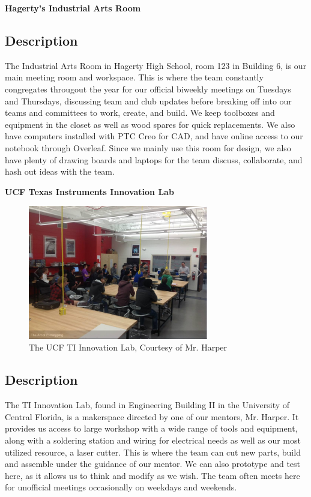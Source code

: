 \textbf {\large Hagerty's Industrial Arts Room}

\subsection*{Description}
The Industrial Arts Room in Hagerty High School, room 123 in Building 6, is our main meeting room and workspace. This is where the team constantly congregates througout the year for our official biweekly meetings on Tuesdays and Thursdays, discussing team and club updates before breaking off into our teams and committees to work, create, and build. We keep toolboxes and equipment in the closet as well as wood spares for quick replacements. We also have computers installed with PTC Creo for CAD, and have online access to our notebook through Overleaf. Since we mainly use this room for design, we also have plenty of drawing boards and laptops for the team discuss, collaborate, and hash out ideas with the team. 

\textbf {\large UCF Texas Instruments Innovation Lab}
 \begin{figure}[h!]
 \centering
   \includegraphics[width=0.7\textwidth, angle=0]{Workspaces/innovationlab.PNG}
  \caption{The UCF TI Innovation Lab, Courtesy of Mr. Harper}
 \end{figure}

\subsection*{Description}
The TI Innovation Lab, found in Engineering Building II in the University of Central Florida, is a makerspace directed by one of our mentors, Mr. Harper. It provides us access to large workshop with a wide range of tools and equipment, along with a soldering station and wiring for electrical needs as well as our most utilized resource, a laser cutter. This is where the team can cut new parts, build and assemble under the guidance of our mentor. We can also prototype and test here, as it allows us to think and modify as we wish. The team often meets here for unofficial meetings occasionally on weekdays and weekends. 

